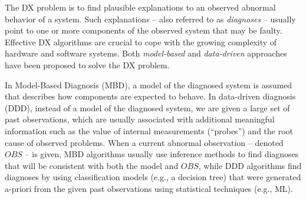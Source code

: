 \documentclass[12pt]{article}
\begin{document}
The DX problem is to find plausible explanations to an observed abnormal behavior of a system. Such explanations -- also referred to as {\em diagnoses} -- usually point to one or more components of the observed system that may be faulty. 
Effective DX algorithms are crucial to cope with the growing complexity of hardware and software systems. 
Both  {\em model-based} and {\em data-driven} approaches have been proposed to solve the DX problem. 


In Model-Based Diagnosis (MBD), a model of the diagnosed system is assumed that describes how components are expected to behave. In data-driven diagnosis (DDD), instead of a model of the diagnosed system, we are given a large set of past observations, which are usually associated with additional meaningful information such as the value of internal measurements (``probes'') and the root cause of observed problems. 
When a current abnormal observation -- denoted $OBS$ -- is given, MBD algorithms usually use inference methods to find diagnoses that will be consistent with both the model and $OBS$, while DDD algorithms find diagnoses by using classification models (e.g., a decision tree) that were generated a-priori from the given past observations using statistical techniques (e.g., ML). 
\end{document}
